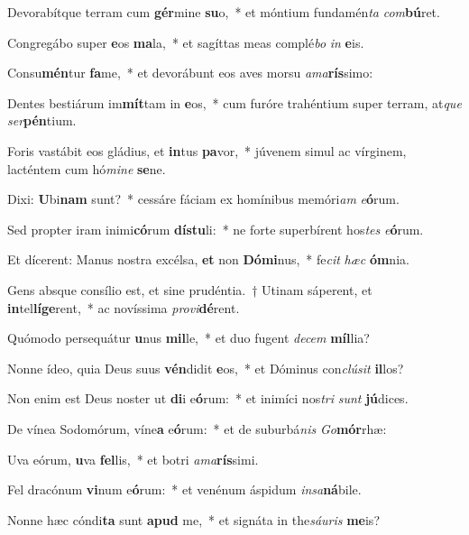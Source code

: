 \item Devorabítque terram cum \textbf{gér}mine \textbf{su}o,~* et móntium fundamén\textit{ta} \textit{com}\textbf{bú}ret.
\item Congregábo super \textbf{e}os \textbf{ma}la,~* et sagíttas meas complé\textit{bo} \textit{in} \textbf{e}is.
\item Consu\textbf{mén}tur \textbf{fa}me,~* et devorábunt eos aves morsu \textit{a}\textit{ma}\textbf{rís}simo:
\item Dentes bestiárum im\textbf{mít}tam in \textbf{e}os,~* cum furóre trahéntium super terram, at\textit{que} \textit{ser}\textbf{pén}tium.
\item Foris vastábit eos gládius, et \textbf{in}tus \textbf{pa}vor,~* júvenem simul ac vírginem, lacténtem cum hó\textit{mi}\textit{ne} \textbf{se}ne.
\item Dixi: \textbf{U}bi\textbf{nam} sunt?~* cessáre fáciam ex homínibus memóri\textit{am} \textit{e}\textbf{ó}rum.
\item Sed propter iram inimi\textbf{có}rum \textbf{dís}\textbf{tu}li:~* ne forte superbírent hos\textit{tes} \textit{e}\textbf{ó}rum.
\item Et dícerent: Manus nostra excélsa, \textbf{et} non \textbf{Dó}\textbf{mi}nus,~* fe\textit{cit} \textit{hæc} \textbf{óm}nia.
\item Gens absque consílio est, et sine prudéntia.~† Utinam sáperent, et \textbf{in}tel\textbf{lí}\textbf{ge}rent,~* ac novíssima \textit{pro}\textit{vi}\textbf{dé}rent.
\item Quómodo persequátur \textbf{u}nus \textbf{mil}le,~* et duo fugent \textit{de}\textit{cem} \textbf{míl}lia?
\item Nonne ídeo, quia Deus suus \textbf{vén}didit \textbf{e}os,~* et Dóminus con\textit{clú}\textit{sit} \textbf{il}los?
\item Non enim est Deus noster ut \textbf{di}i e\textbf{ó}rum:~* et inimíci nos\textit{tri} \textit{sunt} \textbf{jú}dices.
\item De vínea Sodomórum, víne\textbf{a} e\textbf{ó}rum:~* et de suburbá\textit{nis} \textit{Go}\textbf{mór}rhæ:
\item Uva eórum, \textbf{u}va \textbf{fel}lis,~* et botri \textit{a}\textit{ma}\textbf{rís}simi.
\item Fel dracónum \textbf{vi}num e\textbf{ó}rum:~* et venénum áspidum \textit{in}\textit{sa}\textbf{ná}bile.
\item Nonne hæc cóndi\textbf{ta} sunt \textbf{a}\textbf{pud} me,~* et signáta in the\textit{sáu}\textit{ris} \textbf{me}is?
